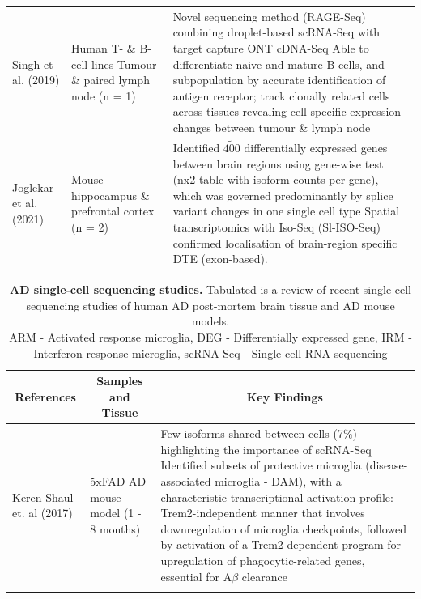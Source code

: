 \begin{landscape}
\begin{longtable}[c]{p{4cm}p{4cm}p{18cm}}
		\centering Singh et al. (2019) \cite{Singh2019} &
		\centering Human T- \& B-cell lines \newline Tumour \& paired lymph node (n = 1)  &
		\tabitem Novel sequencing method (RAGE-Seq) combining droplet-based scRNA-Seq with target capture ONT cDNA-Seq \newline 
		\tabitem Able to differentiate naive and mature B cells, and subpopulation by accurate identification of antigen receptor; track clonally related cells across tissues revealing cell-specific expression changes between tumour \& lymph node \\
		\hdashline[0.5pt/5pt]
		
		\centering Joglekar et al. (2021) \cite{Joglekar2021} &
		\centering Mouse hippocampus \& prefrontal cortex (n = 2) &
		\tabitem Identified $\tilde{400}$ differentially expressed genes between brain regions using gene-wise test (nx2 table with isoform counts per gene), which was governed predominantly by splice variant changes in one single cell type \newline 
		\tabitem Spatial transcriptomics with Iso-Seq (Sl-ISO-Seq) confirmed localisation of brain-region specific DTE (exon-based). 
		\\* \bottomrule
	\end{longtable}
	
	\clearpage
	\begin{longtable}[c]{p{4cm}p{4cm}p{18cm}}
		\caption[AD single-cell sequencing studies]%
		{\textbf{AD single-cell sequencing studies.} Tabulated is a review of recent single cell sequencing studies of human AD post-mortem brain tissue and AD mouse models. \newline ARM - Activated response microglia, DEG - Differentially expressed gene, IRM - Interferon response microglia, scRNA-Seq - Single-cell RNA sequencing}
		\label{tab: longread_AD_advancedstudies}\\
		
		\toprule
		\multicolumn{1}{c}{References} &
		\multicolumn{1}{c}{Samples and Tissue} &
		\multicolumn{1}{c}{Key Findings} \\* \midrule
		\endfirsthead
		\endhead
		\bottomrule
		\endfoot
		\endlastfoot
		\centering Keren-Shaul et. al (2017)\cite{Keren-Shaul2017} &
		\centering 5xFAD AD mouse model (1 - 8 months) &
		\tabitem Few isoforms shared between cells (7\%) highlighting the importance of scRNA-Seq \newline
		\tabitem Identified subsets of protective microglia (disease-associated microglia - DAM), with a characteristic transcriptional activation profile:  Trem2-independent manner that involves downregulation of microglia checkpoints, followed by activation of a Trem2-dependent program for upregulation of phagocytic-related genes, essential for A$\beta$ clearance  \\
		\hdashline[0.5pt/5pt]	
		

\end{longtable}
\end{landscape}
